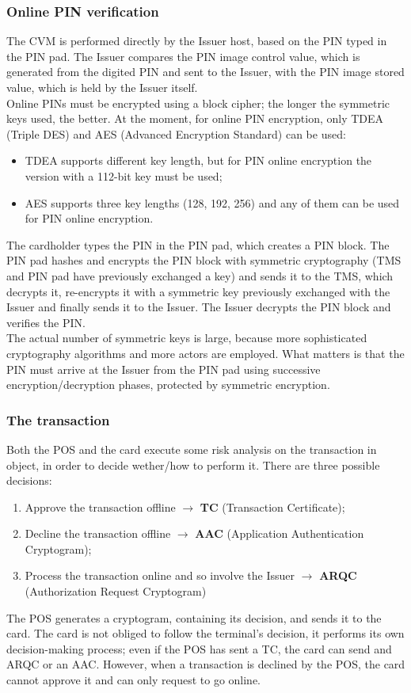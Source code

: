 \documentclass[a4paper, 10pt, titlepage]{article}
\begin{document}
\subsubsection*{Online PIN verification}
The CVM is performed directly by the Issuer host, based on the PIN typed in the PIN pad. The Issuer compares the PIN image control value, which is generated from the digited PIN and sent to the Issuer, with the PIN image stored value, which is held by the Issuer itself. \\
Online PINs must be encrypted using a block cipher; the longer the symmetric keys used, the better. At the moment, for online PIN encryption, only TDEA (Triple DES) and AES (Advanced Encryption Standard) can be used:
\begin{itemize}
\item TDEA supports different key length, but for PIN online encryption the version with a 112-bit key must be used;
\item AES supports three key lengths (128, 192, 256) and any of them can be used for PIN online encryption.
\end{itemize}
The cardholder types the PIN in the PIN pad, which creates a PIN block. The PIN pad hashes and encrypts the PIN block with symmetric cryptography (TMS and PIN pad have previously exchanged a key) and sends it to the TMS, which decrypts it, re-encrypts it with a symmetric key previously exchanged  with the Issuer and finally sends it to the Issuer.
The Issuer decrypts the PIN block and verifies the PIN. \medskip\\
The actual number of symmetric keys is large, because more sophisticated cryptography algorithms and more actors are employed. What matters is that the PIN must arrive at the Issuer from the PIN pad using successive encryption/decryption phases, protected by symmetric encryption.

\subsubsection{The transaction}
Both the POS and the card execute some risk analysis on the transaction in object, in order to decide wether/how to perform it. There are three possible decisions:
\begin{enumerate}
\item Approve the transaction offline $\rightarrow$ \textbf{TC} (Transaction Certificate);
\item Decline the transaction offline $\rightarrow$ \textbf{AAC} (Application Authentication Cryptogram);
\item Process the transaction online and so involve the Issuer $\rightarrow$ \textbf{ARQC} (Authorization Request Cryptogram)
\end{enumerate}
The POS generates a cryptogram, containing its decision, and sends it to the card. The card is not obliged to follow the terminal's decision, it performs its own decision-making process; even if the POS has sent a TC, the card can send and ARQC or an AAC. However, when a transaction is declined by the POS, the card cannot approve it and can only request to go online.
\end{document}
